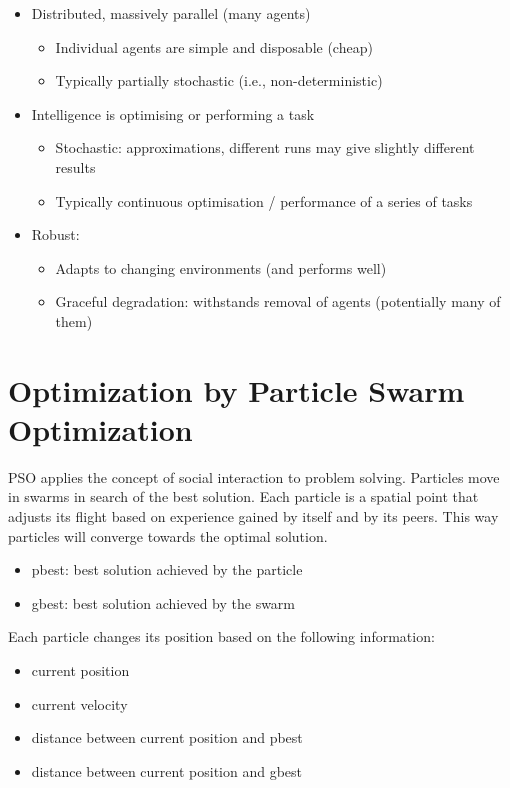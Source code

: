 \documentclass[a4paper,12pt,answers]{article}
\begin{document}
	\begin{itemize}
		\item Distributed, massively parallel (many agents)
		\begin{itemize}
			\item Individual agents are simple and disposable (cheap)
			\item Typically partially stochastic (i.e., non-deterministic)
		\end{itemize}
		\item Intelligence is optimising or performing a task
		\begin{itemize}
			\item Stochastic: approximations, different runs may give slightly different results
			\item Typically continuous optimisation / performance of a series of tasks
		\end{itemize}
		\item Robust:
		\begin{itemize}
			\item Adapts to changing environments (and performs well)
			\item Graceful degradation: withstands removal of agents (potentially many of them)
		\end{itemize}
	\end{itemize}
	
	
	
	\section{Optimization by Particle Swarm Optimization}
	PSO applies the concept of social interaction to problem solving. Particles move in swarms in search of the best solution. Each particle is a spatial point that adjusts its flight based on experience gained by itself and by its peers. This way particles will converge towards the optimal solution.
	
	\begin{itemize}
		\item pbest: best solution achieved by the particle
		\item gbest: best solution achieved by the swarm 
	\end{itemize}
	
	\noindent
	Each particle changes its position based on the following information: 
	\begin{itemize}
		\item current position
		\item current velocity
		\item distance between current position and pbest
		\item distance between current position and gbest
	\end{itemize}
	
\end{document}
